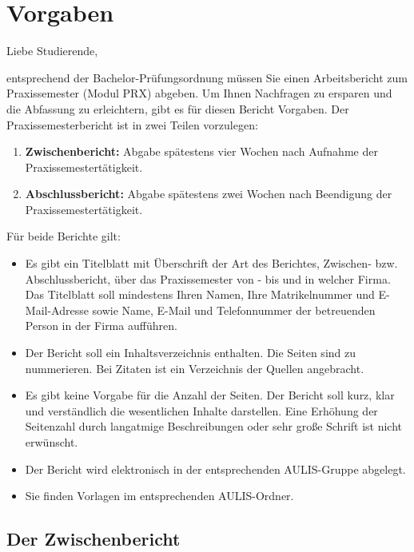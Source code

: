 \documentclass[
]{agujournal2019}
\begin{document}
\section{Vorgaben}\label{vorgaben}

Liebe Studierende,

entsprechend der Bachelor-Prüfungsordnung müssen Sie einen
Arbeitsbericht zum Praxissemester (Modul PRX) abgeben. Um Ihnen
Nachfragen zu ersparen und die Abfassung zu erleichtern, gibt es für
diesen Bericht Vorgaben. Der Praxissemesterbericht ist in zwei Teilen
vorzulegen:

\begin{enumerate}
\def\labelenumi{\arabic{enumi}.}
\item
  \textbf{Zwischenbericht:} Abgabe spätestens vier Wochen nach Aufnahme
  der Praxissemestertätigkeit.
\item
  \textbf{Abschlussbericht:} Abgabe spätestens zwei Wochen nach
  Beendigung der Praxissemestertätigkeit.
\end{enumerate}

Für beide Berichte gilt:

\begin{itemize}
\item
  Es gibt ein Titelblatt mit Überschrift der Art des Berichtes,
  Zwischen- bzw. Abschlussbericht, über das Praxissemester von - bis und
  in welcher Firma. Das Titelblatt soll mindestens Ihren Namen, Ihre
  Matrikelnummer und E-Mail-Adresse sowie Name, E-Mail und Telefonnummer
  der betreuenden Person in der Firma aufführen.
\item
  Der Bericht soll ein Inhaltsverzeichnis enthalten. Die Seiten sind zu
  nummerieren. Bei Zitaten ist ein Verzeichnis der Quellen angebracht.
\item
  Es gibt keine Vorgabe für die Anzahl der Seiten. Der Bericht soll
  kurz, klar und verständlich die wesentlichen Inhalte darstellen. Eine
  Erhöhung der Seitenzahl durch langatmige Beschreibungen oder sehr
  große Schrift ist nicht erwünscht.
\item
  Der Bericht wird elektronisch in der entsprechenden AULIS-Gruppe
  abgelegt.
\item
  Sie finden Vorlagen im entsprechenden AULIS-Ordner.
\end{itemize}

\subsection{Der Zwischenbericht}\label{der-zwischenbericht}
\end{document}
